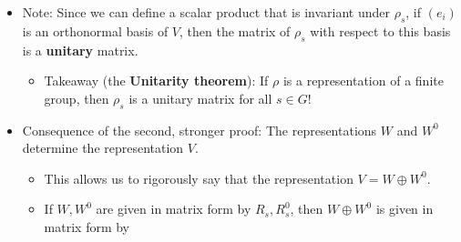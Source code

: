 \documentclass[../notes.tex]{subfiles}
\begin{document}
\begin{itemize}
\begin{theorem}
\begin{proof}[Proof 1 (limited conditions)]
\begin{equation*}
                = [p^0\cdot\rho_s](x)
                = [\rho_s\cdot p^0](x)
                = \rho_s[p^0(x)]
                = \rho_s(0)
                = 0
            \end{equation*}
            But the only way that $p^0$ could map $\rho_s(x)$ to 0 is if $\rho_s(x)\in W^0$, as desired.
        \end{proof}
        \begin{proof}[Proof 2 (orthogonal complement)]
            Let $W^0$ be the orthogonal complement of $W$, and endow $V$ with a \textbf{scalar product} $(x\mid y)$ to turn it into an inner product space. Replace $(x\mid y)$ with the new inner product $\sum_{t\in G}(\rho_tx\mid\rho_ty)$. Now, if it wasn't already, the inner product is invariant under $\rho_s$ for all $s$, i.e., for $s$ arbitrary, we have
            \begin{equation*}
                (\rho_sx\mid\rho_sy) = (x\mid y)
            \end{equation*}
            This means that vectors that were orthogonal before $\rho_s$ is applied to $V$, stay orthogonal after $\rho_s$ is applied to $V$. In particular, since $\rho_s$ preserves $W$ by hypothesis, all vectors orthogonal to $W$ (i.e., all vectors in $W^0$) stay orthogonal to $W$ (i.e., stay in $W^0$) after $\rho_s$ is applied. Thus, $W^0$ is stable under $\rho_s$ as well.
        \end{proof}
    \end{theorem}
    \item Note: Since we can define a scalar product that is invariant under $\rho_s$, if $(e_i)$ is an orthonormal basis of $V$, then the matrix of $\rho_s$ with respect to this basis is a \textbf{unitary} matrix.
    \begin{itemize}
        \item Takeaway (the \textbf{Unitarity theorem}): If $\rho$ is a representation of a finite group, then $\rho_s$ is a unitary matrix for all $s\in G$!
    \end{itemize}
    \item Consequence of the second, stronger proof: The representations $W$ and $W^0$ determine the representation $V$.
    \begin{itemize}
        \item This allows us to rigorously say that the representation $V=W\oplus W^0$.
        \item If $W,W^0$ are given in matrix form by $R_s,R_s^0$, then $W\oplus W^0$ is given in matrix form by

\end{itemize}
\end{itemize}
\end{document}
